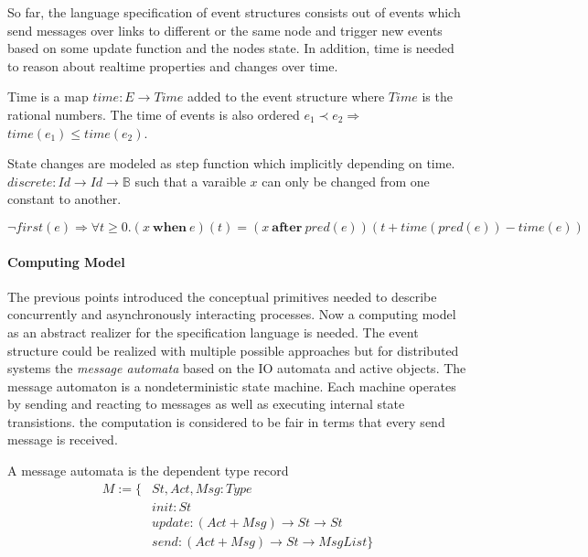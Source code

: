 So far, the language specification of event structures consists out of events
which send messages over links to different or the same node and trigger new
events based on some update function and the nodes state. In addition, time
is needed to reason about realtime properties and changes over time.~\cite{bickford2005causal}

\begin{defi}
  Time is a map $time:E\rightarrow Time$ added to the event structure where $Time$
  is the rational numbers. The time of events is also ordered $e_1\prec e_2\Rightarrow$
  $time(e_1)\le time(e_2)$.
\end{defi}

\begin{defi}
  State changes are modeled as step function which implicitly depending on time.
  $discrete:Id\rightarrow Id\rightarrow \mathbb{B}$ such that a varaible $x$ can only be changed
  from one constant to another.
\end{defi}

\begin{axiom}
  $\neg first(e)\Rightarrow \forall t\ge 0.(x\ \textbf{when}\ e)(t)=
  (x\ \textbf{after}\ pred(e))(t+time(pred(e))-time(e))$
\end{axiom}

\paragraph{Computing Model}
The previous points introduced the conceptual primitives needed to describe
concurrently and asynchronously interacting processes.
Now a computing model as an abstract realizer for the specification language is needed.
The event structure could be realized with multiple possible approaches but
for distributed systems the \textit{message automata} based on the IO automata
and active objects. The message automaton is a nondeterministic state machine.
Each machine operates by sending and reacting to messages as well as
executing internal state transistions.
the computation is considered to be fair in terms that every send message is
received.~\cite{bickford2003logic}


\begin{defi}
  A message automata is the dependent type record
  \begin{align*}
    M:=\{ & St,Act,Msg:Type\\
        & init:St\\
        & update:(Act+Msg)\rightarrow St\rightarrow St\\
        & send:(Act+Msg)\rightarrow St\rightarrow MsgList\}
  \end{align*}  
\end{defi}

